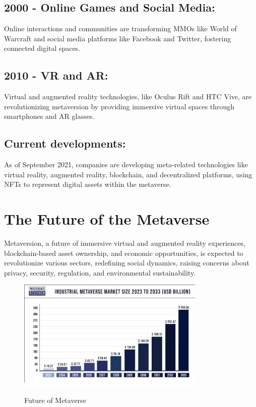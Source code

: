 \subsection{2000 - Online Games and Social Media:}
Online interactions and communities are transforming MMOs like World of Warcraft and social media platforms like Facebook and Twitter, fostering connected digital spaces.
\subsection{2010 - VR and AR:}
Virtual and augmented reality technologies, like Oculus Rift and HTC Vive, are revolutionizing metaversion by providing immersive virtual spaces through smartphones and AR glasses.

\subsection{Current developments:}
As of September 2021, companies are developing meta-related technologies like virtual reality, augmented reality, blockchain, and decentralized platforms, using NFTs to represent digital assets within the metaverse.
\section{The Future of the Metaverse}
Metaversion, a future of immersive virtual and augmented reality experiences, blockchain-based asset ownership, and economic opportunities, is expected to revolutionize various sectors, redefining social dynamics, raising concerns about privacy, security, regulation, and environmental sustainability.
\begin{figure}[h]
    \centering
    \includegraphics[width=0.8\textwidth, height=0.35\textheight]{Images/industrial-metaverse-market-size.png}
    \caption{Future of Metaverse}
    \label{fig:Future of Metaverse}\cite{metaverse-market}
\end{figure}
